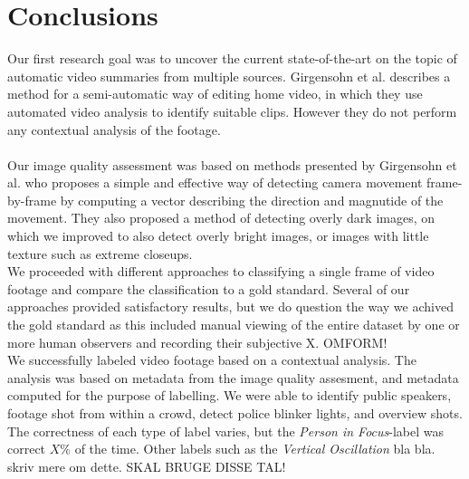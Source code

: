 \section{Conclusions}\label{sec:conc_concs}
%
Our first research goal was to uncover the current state-of-the-art on the topic of automatic video summaries from multiple sources. Girgensohn et al.\cite{Girgensohn:2000:SAH:354401.354415} describes a method for a semi-automatic way of editing home video, in which they use automated video analysis to identify suitable clips. However they do not perform any contextual analysis of the footage.
\\\\
Our image quality assessment was based on methods presented by Girgensohn et al.\cite{Girgensohn:2000:SAH:354401.354415} who proposes a simple and effective way of detecting camera movement frame-by-frame by computing a vector describing the direction and magnutide of the movement. They also proposed a method of detecting overly dark images, on which we improved to also detect overly bright images, or images with little texture such as extreme closeups.\\
We proceeded with different approaches to classifying a single frame of video footage and compare the classification to a gold standard. Several of our approaches provided satisfactory results, but we do question the way we achived the gold standard as this included manual viewing of the entire dataset by one or more human observers and recording their subjective X. OMFORM!\\
We successfully labeled video footage based on a contextual analysis. The analysis was based on metadata from the image quality assesment, and metadata computed for the purpose of labelling. We were able to identify public speakers, footage shot from within a crowd, detect police blinker lights, and overview shots. 
\\
The correctness of each type of label varies, but the \emph{Person in Focus}-label was correct $X\%$ of the time. Other labels such as the \emph{Vertical Oscillation} bla bla. skriv mere om dette. SKAL BRUGE DISSE TAL!
\\\\
